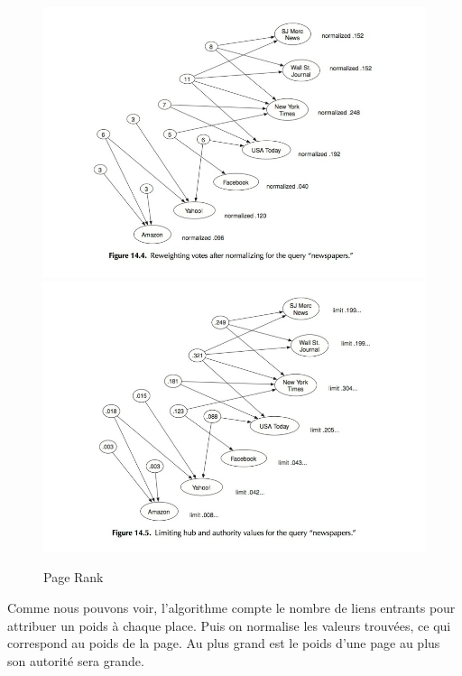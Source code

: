 \begin{figure}
\centering

\includegraphics[scale=0.5]{images/ref/fig-14-4.jpeg}
\includegraphics[scale=0.5]{images/ref/fig-14-5.jpeg}
\caption{Page Rank}
\label{pageRankNews2}
\end{figure}



\newpage

	
Comme nous pouvons voir, l'algorithme compte le nombre de liens entrants pour attribuer un poids à chaque place. Puis on normalise les valeurs trouvées, ce qui correspond au poids de la page.
Au plus grand est le poids d'une page au plus son autorité sera grande.\\
